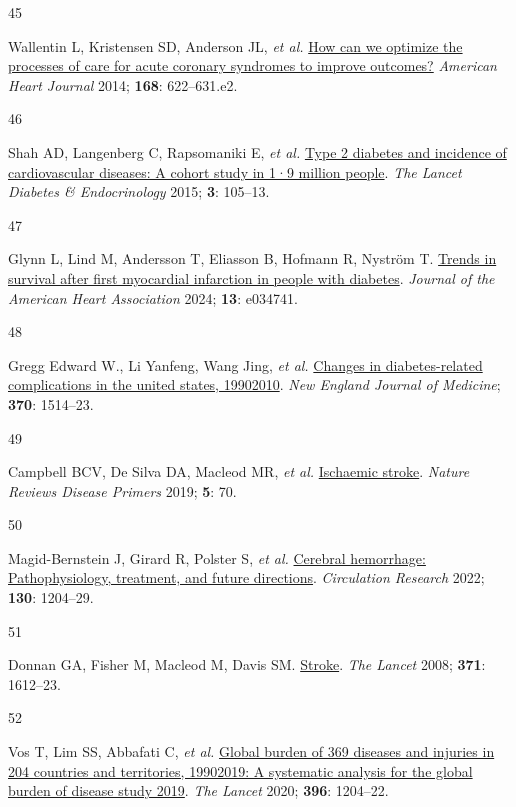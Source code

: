 \documentclass[
  a4paper,
  headsepline=true,
  open=left]{scrbook}
\newlength{\cslhangindent}
\newlength{\csllabelwidth}
\newlength{\cslentryspacingunit} %
\newenvironment{CSLReferences}[2] %
 {%
  \setlength{\parindent}{0pt}
  \ifodd #1
  \let\oldpar\par
  \def\par{\hangindent=\cslhangindent\oldpar}
  \fi
  \setlength{\parskip}{#2\cslentryspacingunit}
 }%
 {}
\newcommand{\CSLLeftMargin}[1]{\parbox[t]{\csllabelwidth}{#1}}
\newcommand{\CSLRightInline}[1]{\parbox[t]{\linewidth - \csllabelwidth}{#1}\break}
\begin{document}
\begin{CSLReferences}{0}{0}
\leavevmode{}%
\CSLLeftMargin{45 }%
\CSLRightInline{Wallentin L, Kristensen SD, Anderson JL, \emph{et al.}
\href{https://doi.org/10.1016/j.ahj.2014.07.006}{How can we optimize the
processes of care for acute coronary syndromes to improve outcomes?}
\emph{American Heart Journal} 2014; \textbf{168}: 622--631.e2.}

\leavevmode{}%
\CSLLeftMargin{46 }%
\CSLRightInline{Shah AD, Langenberg C, Rapsomaniki E, \emph{et al.}
\href{https://doi.org/10.1016/S2213-8587(14)70219-0}{Type 2 diabetes and
incidence of cardiovascular diseases: A cohort study in 1·9 million
people}. \emph{The Lancet Diabetes \& Endocrinology} 2015; \textbf{3}:
105--13.}

\leavevmode{}%
\CSLLeftMargin{47 }%
\CSLRightInline{Glynn L, Lind M, Andersson T, Eliasson B, Hofmann R,
Nyström T. \href{https://doi.org/10.1161/JAHA.123.034741}{Trends in
survival after first myocardial infarction in people with diabetes}.
\emph{Journal of the American Heart Association} 2024; \textbf{13}:
e034741.}

\leavevmode{}%
\CSLLeftMargin{48 }%
\CSLRightInline{Gregg Edward W., Li Yanfeng, Wang Jing, \emph{et al.}
\href{https://doi.org/10.1056/NEJMoa1310799}{Changes in diabetes-related
complications in the united states, 1990{\textendash}2010}. \emph{New
England Journal of Medicine}; \textbf{370}: 1514--23.}

\leavevmode{}%
\CSLLeftMargin{49 }%
\CSLRightInline{Campbell BCV, De Silva DA, Macleod MR, \emph{et al.}
\href{https://doi.org/10.1038/s41572-019-0118-8}{Ischaemic stroke}.
\emph{Nature Reviews Disease Primers} 2019; \textbf{5}: 70.}

\leavevmode{}%
\CSLLeftMargin{50 }%
\CSLRightInline{Magid-Bernstein J, Girard R, Polster S, \emph{et al.}
\href{https://doi.org/10.1161/CIRCRESAHA.121.319949}{Cerebral
hemorrhage: Pathophysiology, treatment, and future directions}.
\emph{Circulation Research} 2022; \textbf{130}: 1204--29.}

\leavevmode{}%
\CSLLeftMargin{51 }%
\CSLRightInline{Donnan GA, Fisher M, Macleod M, Davis SM.
\href{https://doi.org/10.1016/S0140-6736(08)60694-7}{Stroke}. \emph{The
Lancet} 2008; \textbf{371}: 1612--23.}

\leavevmode{}%
\CSLLeftMargin{52 }%
\CSLRightInline{Vos T, Lim SS, Abbafati C, \emph{et al.}
\href{https://doi.org/10.1016/S0140-6736(20)30925-9}{Global burden of
369 diseases and injuries in 204 countries and territories,
1990{\textendash}2019: A systematic analysis for the global burden of
disease study 2019}. \emph{The Lancet} 2020; \textbf{396}: 1204--22.}


\end{CSLReferences}
\end{document}
